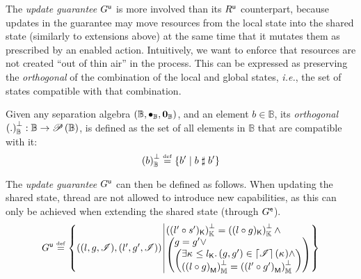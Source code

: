 The \emph{update guarantee} $G^{\textsf{u}}$ is more involved than its $R^{\textsf{u}}$ counterpart, because updates in the guarantee may move resources from the local state into the shared state (similarly to extensions above) at the same time that it mutates them as prescribed by an enabled action. Intuitively, we want to enforce that resources
are not created ``out of thin air'' in the process. This can be expressed as preserving the \emph{orthogonal} of the combination of the local and global states, \textit{i.e.}, the set of states compatible with that combination.
%
\begin{definition}[Orthogonal]\label{def:orthogonal}
Given any separation algebra $(\mathbb{B}, \bullet_{\mathbb{B}}, \mathbf{0}_{\mathbb{B}})$, and an element $b \in \mathbb{B}$, its \emph{orthogonal} $\left( .\right)_{\mathbb{B}}^{\bot} : \mathbb{B} \rightarrow \mathscr{P}\left(\mathbb{B} \right)$, is defined as the set of all elements in $\mathbb{B}$ that are compatible with it:
%
\[
	\left( b\right)_{\mathbb{B}}^{\bot} \mathrel{\stackrel{\smash{\scriptscriptstyle{\mathrm{def}}}}{=}} \left\{ b' \mid b \mathrel{\sharp} b' \right\}
\]
\end{definition}
%
The \emph{update guarantee} $G^{\textsf{u}}$ can then be defined as follows. When updating the shared state, thread are not allowed to introduce new capabilities, as this can only be achieved when extending the shared state (through $G^{\textsf{e}}$).
%
\[
	\updateG \eqdef
 	\left\{
	\begin{array}{@{} l @{\hspace*{2pt}} | @{\hspace*{2pt}} r @{}}
	  \left(
	     	(l, g, \lmod),
	     	(l', g', \lmod)
		\right)
  	&
  	\begin{array}{@{} l @{} }
  		\ortCap{\capPart{(l' \composeL s')}}  = \ortCap{\capPart{(l \composeL g)}} \land\\
	  	\left(
	  	\begin{array}{@{} l @{} }
	 		g = g' \lor\\
	 	  	\left(
	 	  	\begin{array}{@{} l @{}}
	 	  		\exsts{\ca{} \leq \capPart{l}}
	 	  		(g, g') \in \padAM{\lmod}(\ca{}) \land\\
	 	  	
	 	  	\ortH{\heapPart{\left(l \composeL g\right)}} = 
	 	  	\ortH{\heapPart{\left(l' \composeL g'\right)}}
	 	  	\end{array}	
	 	  	\right)
	 	\end{array}
   		\right)
   		\end{array}
 	\end{array}
	\right\}
\]
%
%

